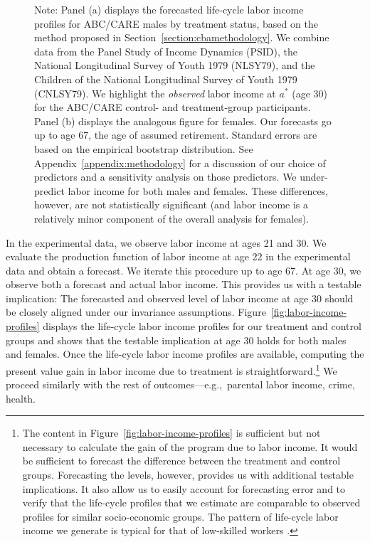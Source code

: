 \begin{figure}
Note: Panel (a) displays the forecasted life-cycle labor income profiles for ABC/CARE males by treatment status, based on the method proposed in Section~\ref{section:cbamethodology}. We combine data from the Panel Study of Income Dynamics (PSID), the National Longitudinal Survey of Youth 1979 (NLSY79), and the Children of the National Longitudinal Survey of Youth 1979 (CNLSY79). We highlight the \textit{observed} labor income at $a^*$ (age 30) for the ABC/CARE control- and treatment-group participants. Panel (b) displays the analogous figure for females. Our forecasts go up to age 67, the age of assumed retirement. Standard errors are based on the empirical bootstrap distribution. See  Appendix~\ref{appendix:methodology} for a discussion of our choice of predictors and a sensitivity analysis on those predictors. We under-predict labor income for both males and females. These differences, however, are not statistically significant (and labor income is a relatively minor component of the overall analysis for females).
\end{figure}

\noindent In the experimental data, we observe labor income at ages 21 and 30. We evaluate the production function of labor income at age 22 in the experimental data and obtain a forecast. We iterate this procedure up to age 67. At age 30, we observe both a forecast and actual labor income. This provides us with a testable implication: The forecasted and observed level of labor income at age 30 should be closely aligned under our invariance assumptions. Figure~\ref{fig:labor-income-profiles} displays the life-cycle labor income profiles for our treatment and control groups and shows that the testable implication at age 30 holds for both males and females. Once the life-cycle labor income profiles are available, computing the present value gain in labor income due to treatment is straightforward.\footnote{The content in Figure~\ref{fig:labor-income-profiles} is sufficient but not necessary to calculate the gain of the program due to labor income. It would be sufficient to forecast the difference between the treatment and control groups. Forecasting the levels, however, provides us with additional testable implications. It also allow us to easily account for forecasting error and to verify that the life-cycle profiles that we estimate are comparable to observed profiles for similar socio-economic groups. The pattern of life-cycle labor income we generate is typical for that of low-skilled workers \citep{Blundell-etal_2015_J-Pub-E,Gladden_Taber_2000_WageProgression,Sanders-Taber_2012_AR,Lagakos_Moll_etal_2016_LifeCycle_NBER}.} We proceed similarly with the rest of outcomes---e.g.,\ parental labor income, crime, health.\\

